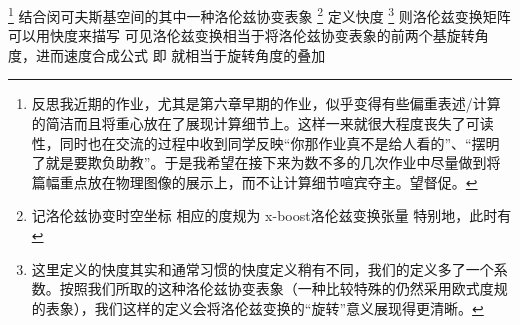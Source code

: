 
    \footnote{反思我近期的作业，尤其是第六章早期的作业，似乎变得有些偏重表述/计算的简洁而且将重心放在了展现计算细节上。这样一来就很大程度丧失了可读性，同时也在交流的过程中收到同学反映“你那作业真不是给人看的”、“摆明了就是要欺负助教”。于是我希望在接下来为数不多的几次作业中尽量做到将篇幅重点放在物理图像的展示上，而不让计算细节喧宾夺主。望督促。}
    结合闵可夫斯基空间的其中一种洛伦兹协变表象
    \footnote{
        记洛伦兹协变时空坐标
        相应的度规为
        x-boost洛伦兹变换张量
        特别地，此时有
        \equa{\Lambda\trans=\Lambda\inv\label{6.4_正交}}
    }
    定义快度
    \footnote{这里定义的快度其实和通常习惯的快度定义\nota{\xi\equiv\tanh\inv\beta}稍有不同，我们的定义多了一个系数\nota{\i}。按照我们所取的这种洛伦兹协变表象（一种比较特殊的仍然采用欧式度规的表象），我们这样的定义会将洛伦兹变换的“旋转”意义展现得更清晰。}
    \equa{\xi\equiv\tan\inv\kuohao{\i\be}}
    则洛伦兹变换矩阵可以用快度来描写
    \equa{-\i\bega=\tan\xi\cos\xi=\sin\xi}
    可见洛伦兹变换相当于将洛伦兹协变表象的前两个基旋转\nota{\xi}角度，进而速度合成公式
    即
    就相当于旋转角度的叠加
    
